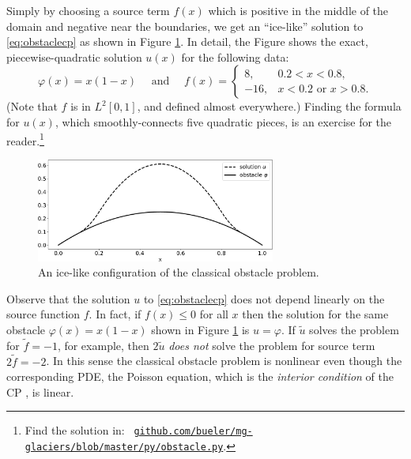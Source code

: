 \documentclass[letterpaper,final,12pt,reqno]{amsart}
\numberwithin{equation}{section}
\numberwithin{figure}{section}
\numberwithin{table}{section}
\begin{document}
Simply by choosing a source term $f(x)$ which is positive in the middle of the domain and negative near the boundaries, we get an ``ice-like'' solution to \eqref{eq:obstaclecp} as shown in Figure \ref{fig:icelike}.  In detail, the Figure shows the exact, piecewise-quadratic solution $u(x)$ for the following data:
\begin{equation}
\varphi(x) = x(1-x) \quad \text{ and } \quad f(x) = \begin{cases} 8, & 0.2 < x < 0.8, \\
                                                               -16, & x<0.2 \text{ or } x>0.8. \end{cases}  \label{eq:icelikedetails}
\end{equation}
(Note that $f$ is in $L^2[0,1]$, and defined almost everywhere.)  Finding the formula for $u(x)$, which smoothly-connects five quadratic pieces, is an exercise for the reader.\footnote{Find the solution in: \, \href{https://github.com/bueler/mg-glaciers/blob/master/py/obstacle.py}{\texttt{github.com/bueler/mg-glaciers/blob/master/py/obstacle.py}}.}

\begin{figure}
\includegraphics[width=0.7\textwidth]{fixfigs/icelike.pdf}
\caption{An ice-like configuration of the classical obstacle problem.}
\label{fig:icelike}
\end{figure}

Observe that the solution $u$ to \eqref{eq:obstaclecp} does not depend linearly on the source function $f$.  In fact, if $f(x)\le 0$ for all $x$ then the solution for the same obstacle $\varphi(x)=x(1-x)$ shown in Figure \ref{fig:icelike} is $u=\varphi$.  If $\tilde u$ solves the problem for $\tilde f= -1$, for example, then $2\tilde u$ \emph{does not} solve the problem for source term $2\tilde f = -2$.  In this sense the classical obstacle problem is nonlinear even though the corresponding PDE, the Poisson equation, which is the \emph{interior condition} of the CP \cite{KinderlehrerStampacchia1980}, is linear.
\end{document}
